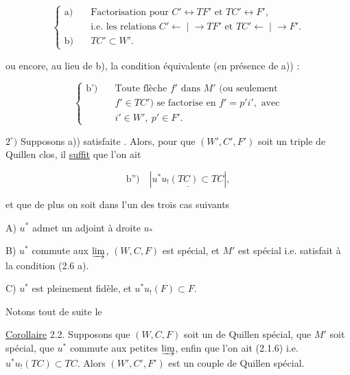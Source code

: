 \[
\left\{\begin{aligned}
\text{a)}\quad &\text{Factorisation pour } C'\longleftrightarrow TF'\text{ et }TC'\longleftrightarrow F',\\
&\text{i.e. les relations } C' \mathrel{\longleftarrow\!\mid\!\longrightarrow} TF'\text{ et }TC' \mathrel{\longleftarrow\!\mid\!\longrightarrow} F'.\\
\text{b)}\quad &TC'\subset W'.
\end{aligned}\right.\tag*{(2.1.4)}
\]

ou encore, au lieu de b), la condition équivalente
(en présence de a)) :

\[
\left\{\begin{aligned}
\text{b')}\quad &\text{Toute flèche }f'\text{ dans }M'\text{ (ou seulement}\\
&f'\in TC')\text{ se factorise en }f'=p'i',\text{ avec}\\
&i'\in W',\ p'\in F'.
\end{aligned}\right.\tag*{(2.1.5)}
\]

$2^\circ)$ Supposons  a)) satisfaite . Alors, pour que
$(W',C',F')$ soit un triple de Quillen clos,
il \uline{suffit} que l'on ait

\[
\text{b'')}\quad\left|\underline{u^*u_!(TC)\subset TC}\right|,\tag*{(2.1.6)}
\]

et que de plus on soit dans l'un des
trois cas suivants

A) $u^*$ admet un adjoint à droite $u_*$

B) $u^*$ commute aux  $\varinjlim$, $(W,C,F)$
est spécial, et $M'$ est spécial i.e. satisfait à la
condition (2.6 a).

C) $u^*$ est pleinement fidèle, et $u^*u_!(F)\subset F$.

Notons tout de suite le

\uline{Corollaire} 2.2. Supposons que $(W,C,F)$ soit un
 de Quillen spécial, que $M'$ soit spécial,
 que $u^*$ commute aux petites $\varinjlim$,
enfin que l'on ait (2.1.6) i.e. $u^*u_!(TC)\subset TC$.
Alors $(W',C',F')$ est un couple de Quillen
spécial.
